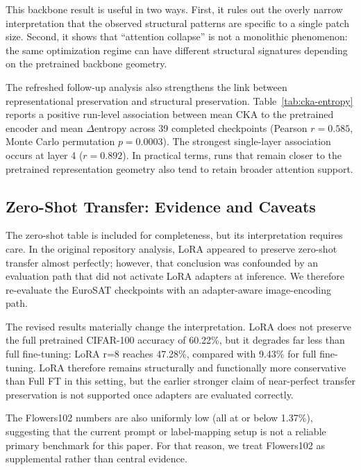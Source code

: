 \documentclass[10pt]{article}
\begin{document}


This backbone result is useful in two ways. First, it rules out the overly narrow interpretation that the observed structural patterns are specific to a single patch size. Second, it shows that ``attention collapse'' is not a monolithic phenomenon: the same optimization regime can have different structural signatures depending on the pretrained backbone geometry.

The refreshed follow-up analysis also strengthens the link between representational preservation and structural preservation. Table~\ref{tab:cka-entropy} reports a positive run-level association between mean CKA to the pretrained encoder and mean $\Delta$entropy across 39 completed checkpoints (Pearson $r=0.585$, Monte Carlo permutation $p=0.0003$). The strongest single-layer association occurs at layer 4 ($r=0.892$). In practical terms, runs that remain closer to the pretrained representation geometry also tend to retain broader attention support.



\subsection{Zero-Shot Transfer: Evidence and Caveats}
The zero-shot table is included for completeness, but its interpretation requires care. In the original repository analysis, LoRA appeared to preserve zero-shot transfer almost perfectly; however, that conclusion was confounded by an evaluation path that did not activate LoRA adapters at inference. We therefore re-evaluate the EuroSAT checkpoints with an adapter-aware image-encoding path.



The revised results materially change the interpretation. LoRA does not preserve the full pretrained CIFAR-100 accuracy of 60.22\%, but it degrades far less than full fine-tuning: LoRA r=8 reaches 47.28\%, compared with 9.43\% for full fine-tuning. LoRA therefore remains structurally and functionally more conservative than Full FT in this setting, but the earlier stronger claim of near-perfect transfer preservation is not supported once adapters are evaluated correctly.

The Flowers102 numbers are also uniformly low (all at or below 1.37\%), suggesting that the current prompt or label-mapping setup is not a reliable primary benchmark for this paper. For that reason, we treat Flowers102 as supplemental rather than central evidence.
\end{document}
